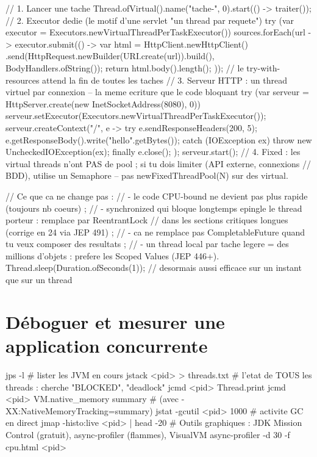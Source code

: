 \begin{codejava}
// 1. Lancer une tache
Thread.ofVirtual().name("tache-", 0).start(() -> traiter());
// 2. Executor dedie (le motif d'une servlet "un thread par requete")
try (var executor = Executors.newVirtualThreadPerTaskExecutor()) {
    sources.forEach(url -> executor.submit(() -> { var html = HttpClient.newHttpClient()
            .send(HttpRequest.newBuilder(URI.create(url)).build(), BodyHandlers.ofString());
        return html.body().length(); }));
}    // le try-with-resources attend la fin de toutes les taches
// 3. Serveur HTTP : un thread virtuel par connexion -- la meme ecriture que le code bloquant
try (var serveur = HttpServer.create(new InetSocketAddress(8080), 0)) {
    serveur.setExecutor(Executors.newVirtualThreadPerTaskExecutor());
    serveur.createContext("/", e -> {
        try { e.sendResponseHeaders(200, 5); e.getResponseBody().write("hello".getBytes()); }
        catch (IOException ex) { throw new UncheckedIOException(ex); }
        finally { e.close(); }
    });
    serveur.start();
}
// 4. Fixed : les virtual threads n'ont PAS de pool ; si tu dois limiter (API externe, connexions
//    BDD), utilise un Semaphore -- pas newFixedThreadPool(N) sur des virtual.

// Ce que ca ne change pas :
//  - le code CPU-bound ne devient pas plus rapide (toujours nb coeurs) ;
//  - synchronized qui bloque longtemps epingle le thread porteur : remplace par ReentrantLock
//    dans les sections critiques longues (corrige en 24 via JEP 491) ;
//  - ca ne remplace pas CompletableFuture quand tu veux composer des resultats ;
//  - un thread local par tache legere = des millions d'objets : prefere les Scoped Values (JEP 446+).
Thread.sleep(Duration.ofSeconds(1));           // desormais aussi efficace sur un instant que sur un thread
\end{codejava}

\section{D\'eboguer et mesurer une application concurrente}

\begin{terminal}
jps -l                                  # lister les JVM en cours
jstack <pid> > threads.txt              # l'etat de TOUS les threads : cherche "BLOCKED", "deadlock"
jcmd <pid> Thread.print
jcmd <pid> VM.native_memory summary      # (avec -XX:NativeMemoryTracking=summary)
jstat -gcutil <pid> 1000                 # activite GC en direct
jmap -histo:live <pid> | head -20
# Outils graphiques : JDK Mission Control (gratuit), async-profiler (flammes), VisualVM
async-profiler -d 30 -f cpu.html <pid>
\end{terminal}


